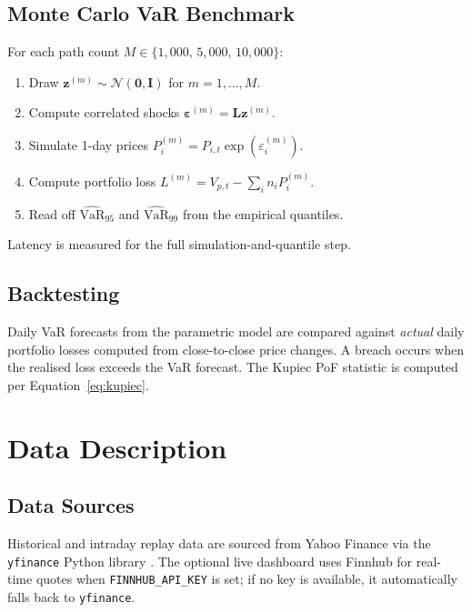 \documentclass[12pt, a4paper]{article}
\newcommand{\VaR}{\mathrm{VaR}}
\newcommand{\N}{\mathcal{N}}
\begin{document}
\subsection{Monte Carlo VaR Benchmark}

For each path count $M \in \{1{,}000,\,5{,}000,\,10{,}000\}$:
\begin{enumerate}
  \item Draw $\bm{z}^{(m)} \sim \N(\bm{0},\bm{I})$ for $m = 1, \ldots, M$.
  \item Compute correlated shocks $\bm{\varepsilon}^{(m)} = \bm{L}\bm{z}^{(m)}$.
  \item Simulate 1-day prices $P_{i}^{(m)} = P_{i,t}\exp(\varepsilon_i^{(m)})$.
  \item Compute portfolio loss $L^{(m)} = V_{p,t} - \sum_i n_i P_i^{(m)}$.
  \item Read off $\widehat{\VaR}_{95}$ and $\widehat{\VaR}_{99}$ from the
        empirical quantiles.
\end{enumerate}
Latency is measured for the full simulation-and-quantile step.

\subsection{Backtesting}

Daily VaR forecasts from the parametric model are compared against
\emph{actual} daily portfolio losses computed from close-to-close price
changes.  A breach occurs when the realised loss exceeds the VaR forecast.
The Kupiec PoF statistic is computed per Equation~\eqref{eq:kupiec}.

\section{Data Description}
\label{sec:data}

\subsection{Data Sources}

Historical and intraday replay data are sourced from Yahoo Finance via the
\texttt{yfinance} Python library \citep{yfinance}.  The optional live dashboard
uses Finnhub for real-time quotes when \texttt{FINNHUB\_API\_KEY} is set; if no
key is available, it automatically falls back to \texttt{yfinance}.
\end{document}
